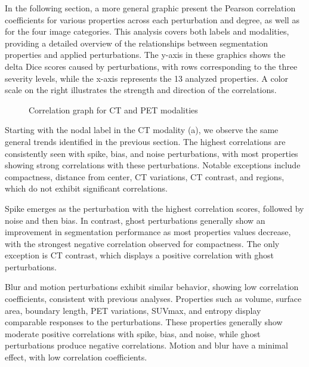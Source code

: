 \newpage

In the following section, a more general graphic present the Pearson correlation coefficients for various properties across each perturbation and degree, 
as well as for the four image categories. This analysis covers both labels and modalities, providing a detailed overview of the relationships between segmentation 
properties and applied perturbations. The y-axis in these graphics shows the delta Dice scores caused by perturbations, with rows corresponding to the three severity levels,
 while the x-axis represents the 13 analyzed properties. A color scale on the right illustrates the strength and direction of the correlations.
\begin{figure}[ht]
    \centering
    \hfill
    \hfill
    \vfill
    \hfill
    \hfill
    \caption{Correlation graph for CT and PET modalities}
    \label{fig:four_subfigures}
\end{figure}
\newpage
Starting with the nodal label in the CT modality (a), we observe the same general trends identified in the previous section. The highest correlations are consistently seen with spike, bias, and noise perturbations, with most properties showing strong correlations with these perturbations. Notable exceptions include compactness, distance from center, CT variations, CT contrast, and regions, which do not exhibit significant correlations.

Spike emerges as the perturbation with the highest correlation scores, followed by noise and then bias. In contrast, ghost perturbations generally show an improvement in segmentation performance as most properties values decrease, with the strongest negative correlation observed for compactness. The only exception is CT contrast, which displays a positive correlation with ghost perturbations.

Blur and motion perturbations exhibit similar behavior, showing low correlation coefficients, consistent with previous analyses. Properties such as volume, surface area, boundary length, PET variations, SUVmax, and entropy display comparable responses to the perturbations. These properties generally show moderate positive correlations with spike, bias, and noise, while ghost perturbations produce negative correlations. Motion and blur have a minimal effect, with low correlation coefficients.

